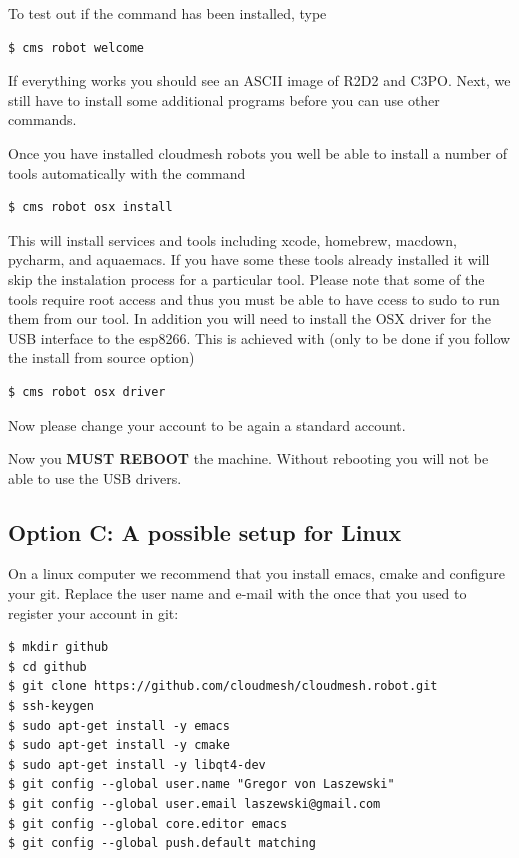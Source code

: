 To test out if the command has been installed, type

\begin{verbatim}
$ cms robot welcome
\end{verbatim}

If everything works you should see an ASCII image of R2D2 and C3PO.
Next, we still have to install some additional programs before you can
use other commands.

Once you have installed cloudmesh robots you well be able to install a
number of tools automatically with the command

\begin{verbatim}
$ cms robot osx install
\end{verbatim}

This will install services and tools including xcode, homebrew, macdown,
pycharm, and aquaemacs. If you have some these tools already installed
it will skip the instalation process for a particular tool. Please note
that some of the tools require root access and thus you must be able to
have ccess to sudo to run them from our tool. In addition you will need
to install the OSX driver for the USB interface to the esp8266. This is
achieved with (only to be done if you follow the install from source
option)

\begin{verbatim}
$ cms robot osx driver
\end{verbatim}

Now please change your account to be again a standard account.

Now you \textbf{MUST REBOOT} the machine. Without rebooting you will not
be able to use the USB drivers.

\subsection{Option C: A possible setup for
Linux}\label{option-c-a-possible-setup-for-linux}

On a linux computer we recommend that you install emacs, cmake and
configure your git. Replace the user name and e-mail with the once that
you used to register your account in git:

\begin{verbatim}
$ mkdir github
$ cd github
$ git clone https://github.com/cloudmesh/cloudmesh.robot.git
$ ssh-keygen
$ sudo apt-get install -y emacs
$ sudo apt-get install -y cmake
$ sudo apt-get install -y libqt4-dev
$ git config --global user.name "Gregor von Laszewski"
$ git config --global user.email laszewski@gmail.com
$ git config --global core.editor emacs
$ git config --global push.default matching
\end{verbatim}

